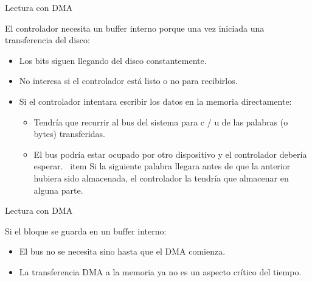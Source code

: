 \documentclass{beamer}
\begin{document}
\begin{frame}{Lectura con DMA}
    
        \begin{block}{
            El controlador necesita un buffer interno porque una vez iniciada una transferencia del disco:
            \pause
        }
        \begin{itemize}
            \item {
                Los bits siguen llegando del disco constantemente.
                \pause
            }
            
            \item {
                 No interesa si el controlador está listo o no para recibirlos.
                \pause
            }
            \item {
                 Si el controlador intentara escribir los datos en la memoria directamente:
                \pause
                \begin{itemize}
                    \item {
                        Tendría que recurrir al bus del sistema para c / u de las palabras (o bytes) transferidas.
                        \pause
                    }
                    \item {
                        El bus podría estar ocupado por otro dispositivo y el controlador debería esperar.
                        \pause
                    }
                    \ item {
                        Si la siguiente palabra llegara antes de que la anterior hubiera sido almacenada, el controlador la tendría que almacenar en alguna parte.
                        \pause
                    }
                \end{itemize}
            }
            
        \end{itemize}
        \end{block}
        
\end{frame}

\begin{frame}{Lectura con DMA}
    
        \begin{block}{
            Si el bloque se guarda en un buffer interno:
            \pause
        }
        \begin{itemize}
            \item {
                El bus no se necesita sino hasta que el DMA comienza.
                \pause
            }
            
            \item {
                 La transferencia DMA a la memoria ya no es un aspecto crítico del tiempo.
            }
            
        \end{itemize}
        \end{block}
        
\end{frame}
\end{document}
